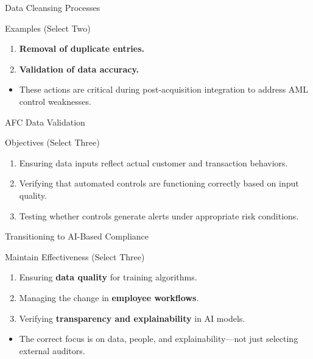 \documentclass{beamer}
\begin{document}
	\begin{frame}{Data Cleansing Processes}
		\begin{block}{Examples (Select Two)}
			\begin{enumerate}
				\item \textbf{Removal of duplicate entries.}
				\item \textbf{Validation of data accuracy.}
			\end{enumerate}
		\end{block}
		\begin{itemize}
			\item These actions are critical during post-acquisition integration to address AML control weaknesses.
		\end{itemize}
	\end{frame}
	
	\begin{frame}{AFC Data Validation}
		\begin{block}{Objectives (Select Three)}
			\begin{enumerate}
				\item Ensuring data inputs reflect actual customer and transaction behaviors.
				\item Verifying that automated controls are functioning correctly based on input quality.
				\item Testing whether controls generate alerts under appropriate risk conditions.
			\end{enumerate}
		\end{block}
	\end{frame}
	
	\begin{frame}{Transitioning to AI-Based Compliance}
		\begin{block}{Maintain Effectiveness (Select Three)}
			\begin{enumerate}
				\item Ensuring \textbf{data quality} for training algorithms.
				\item Managing the change in \textbf{employee workflows}.
				\item Verifying \textbf{transparency and explainability} in AI models.
			\end{enumerate}
		\end{block}
		\begin{itemize}
			\item The correct focus is on data, people, and explainability—not just selecting external auditors.
		\end{itemize}
	\end{frame}
	
\end{document}
